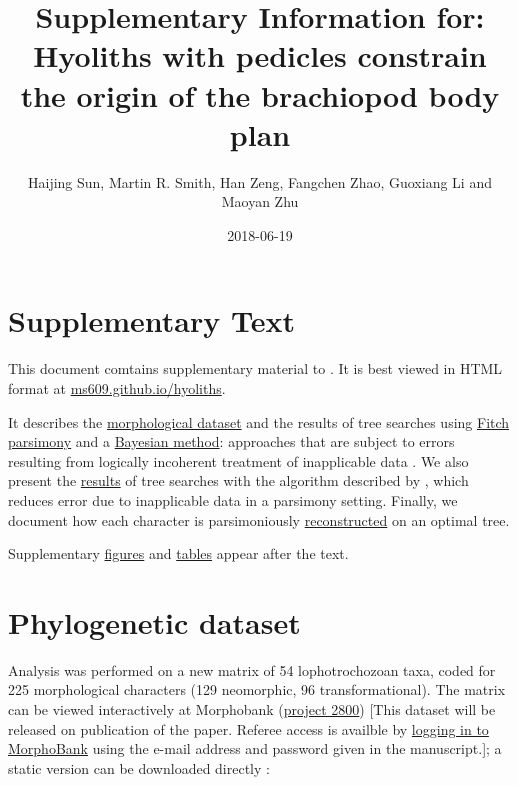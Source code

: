\documentclass[openany]{book}
\title{Supplementary Information for: \newline\newline Hyoliths with pedicles
constrain the origin of the brachiopod body plan}
\author{Haijing Sun, Martin R. Smith, Han Zeng, Fangchen Zhao, Guoxiang Li and
Maoyan Zhu}
\date{2018-06-19}
\begin{document}
\maketitle

{
\setcounter{tocdepth}{1}
\tableofcontents
}
\chapter*{Supplementary Text}\label{supplementary-text}

This document comtains supplementary material to
\citet{Sun2018Hyolithswith}. It is best viewed in HTML format at
\href{https://ms609.github.io/hyoliths/}{ms609.github.io/hyoliths}.

It describes the \protect\hyperlink{dataset}{morphological dataset} and
the results of tree searches using \protect\hyperlink{fitch}{Fitch
parsimony} and a \protect\hyperlink{bayesian}{Bayesian method}:
approaches that are subject to errors resulting from logically
incoherent treatment of inapplicable data \citep{Maddison1993}. We also
present the \protect\hyperlink{treesearch}{results} of tree searches
with the algorithm described by \citet{Brazeau2018}, which reduces error
due to inapplicable data in a parsimony setting. Finally, we document
how each character is parsimoniously
\protect\hyperlink{reconstructions}{reconstructed} on an optimal tree.

Supplementary \protect\hyperlink{figures}{figures} and
\protect\hyperlink{table}{tables} appear after the text.







\hypertarget{dataset}{\chapter{Phylogenetic dataset}\label{dataset}}

Analysis was performed on a new matrix of 54 lophotrochozoan taxa, coded
for 225 morphological characters (129 neomorphic, 96 transformational).
The matrix can be viewed interactively at Morphobank
(\href{https://morphobank.org/permalink/?P2800}{project 2800}) {[}This
dataset will be released on publication of the paper. Referee access is
availble by
\href{https://morphobank.org/index.php/LoginReg/form}{logging in to
MorphoBank} using the e-mail address and password given in the
manuscript.{]}; a static version can be downloaded directly :
\end{document}
